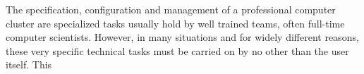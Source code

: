 The specification, configuration and management of a professional computer cluster are specialized
tasks usually hold by well trained teams, often full-time computer scientists. However, in
many situations and for widely different reasons, these very specific technical tasks must
be carried on by no other than the user itself. This
